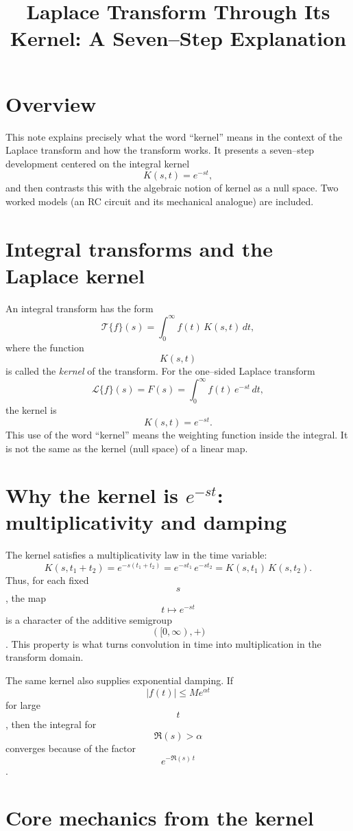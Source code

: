 \documentclass[12pt,a4paper]{article}
\title{Laplace Transform Through Its Kernel: A Seven--Step Explanation}
\author{}
\date{}
\begin{document}
	\maketitle
	
	\section*{Overview}
	This note explains precisely what the word ``kernel'' means in the context of the Laplace transform and how the transform works. It presents a seven--step development centered on the integral kernel
	$$
	K(s,t)=e^{-st},
	$$
	and then contrasts this with the algebraic notion of kernel as a null space. Two worked models (an RC circuit and its mechanical analogue) are included.
	
	\section*{ Integral transforms and the Laplace kernel}
	An integral transform has the form
	$$
	\mathcal{T}\{f\}(s)=\int_{0}^{\infty} f(t)\,K(s,t)\,dt,
	$$
	where the function $$K(s,t)$$ is called the \emph{kernel} of the transform. For the one--sided Laplace transform
	$$
	\mathcal{L}\{f\}(s)=F(s)=\int_{0}^{\infty} f(t)\,e^{-st}\,dt,
	$$
	the kernel is
	$$
	K(s,t)=e^{-st}.
	$$
	This use of the word ``kernel'' means the weighting function inside the integral. It is not the same as the kernel (null space) of a linear map.
	
	\section*{Why the kernel is \( e^{-st} \): multiplicativity and damping}
	The kernel satisfies a multiplicativity law in the time variable:
	$$
	K(s,t_1+t_2)=e^{-s(t_1+t_2)}=e^{-st_1}\,e^{-st_2}=K(s,t_1)\,K(s,t_2).
	$$
	Thus, for each fixed $$s$$, the map $$t\mapsto e^{-st}$$ is a character of the additive semigroup $$([0,\infty),+)$$. This property is what turns convolution in time into multiplication in the transform domain.
	
	The same kernel also supplies exponential damping. If $$|f(t)|\le M e^{\alpha t}$$ for large $$t$$, then the integral for $$\Re(s)>\alpha$$ converges because of the factor $$e^{-\Re(s)\,t}$$.
	
	\section*{Core mechanics from the kernel}
\end{document}
